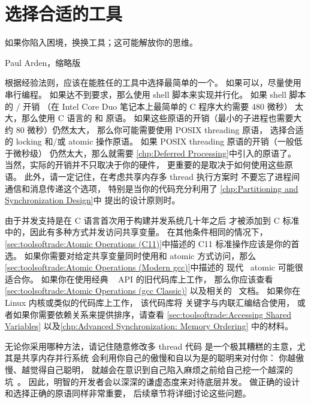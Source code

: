 \section{选择合适的工具}
\label{sec:toolsoftrade:The Right Tool for the Job: How to Choose?}
%
\epigraph{如果你陷入困境，换换工具；这可能解放你的思维。}
	 {Paul Arden，缩略版}

根据经验法则，应该在能胜任的工具中选择最简单的一个。
如果可以，尽量使用串行编程。
如果达不到要求，那么使用 shell 脚本来实现并行化。
如果 shell 脚本的 / 开销
（在 Intel Core Duo 笔记本上最简单的 C 程序大约需要 480 微秒）
太大，那么使用 C 语言的  和  原语。
如果这些原语的开销（最小的子进程也需要大约 80 微秒）仍然太大，
那么你可能需要使用 POSIX threading 原语，
选择合适的 locking 和/或 atomic 操作原语。
如果 POSIX threading 原语的开销（一般低于微秒级）
仍然太大，那么就需要
\cref{chp:Deferred Processing}中引入的原语了。
当然，实际的开销并不只取决于你的硬件，
更重要的是取决于如何使用这些原语。
此外，请一定记住，在考虑共享内存多 thread 执行方案时
不要忘了进程间通信和消息传递这个选项，
特别是当你的代码充分利用了
\cref{chp:Partitioning and Synchronization Design}中
提出的设计原则时。

\QuickQuizEnd

由于并发支持是在 C 语言首次用于构建并发系统几十年之后
才被添加到 C 标准中的，因此有多种方式并发访问共享变量。
在其他条件相同的情况下，
\cref{sec:toolsoftrade:Atomic Operations (C11)}中描述的
C11 标准操作应该是你的首选。
如果你需要对给定共享变量同时使用和
atomic 方式访问，那么
\cref{sec:toolsoftrade:Atomic Operations (Modern gcc)}中描述的
现代 \GCC\ atomic 可能很适合你。
如果你在使用经典 \GCC\  API 的旧代码库上工作，
那么你应该查看
\cref{sec:toolsoftrade:Atomic Operations (gcc Classic)}
以及相关的 \GCC\ 文档。
如果你在 Linux 内核或类似的代码库上工作，
该代码库将  关键字与内联汇编结合使用，
或者如果你需要依赖关系来提供排序，请查看
\cref{sec:toolsoftrade:Accessing Shared Variables}
以及\cref{chp:Advanced Synchronization: Memory Ordering}
中的材料。

无论你采用哪种方法，请记住随意修改多 thread 代码
是一个极其糟糕的主意，尤其是共享内存并行系统
会利用你自己的傲慢和自以为是的聪明来对付你：
你越傲慢、越觉得自己聪明，
就越会在意识到自己陷入麻烦之前给自己挖一个越深的
坑~\cite{DeadlockEmpire2016}。
因此，明智的开发者会以深深的谦虚态度来对待底层并发。
做正确的设计和选择正确的原语同样非常重要，
后续章节将详细讨论这些问题。

